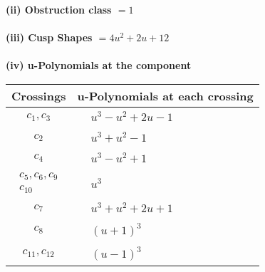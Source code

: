 \documentclass[1p]{elsarticle_modified}
\theoremstyle{definition}
\begin{document}
\flushleft \textbf{(ii) Obstruction class $= 1$}\\~\\
\flushleft \textbf{(iii) Cusp Shapes $= 4 u^2+2 u+12$}\\~\\
\newpage\renewcommand{\arraystretch}{1}
\flushleft \textbf{(iv) u-Polynomials at the component}\newline \\
\begin{tabular}{m{50pt}|m{274pt}}
Crossings & \hspace{64pt}u-Polynomials at each crossing \\
\hline $$\begin{aligned}c_{1},c_{3}\end{aligned}$$&$\begin{aligned}
&u^3- u^2+2 u-1
\end{aligned}$\\
\hline $$\begin{aligned}c_{2}\end{aligned}$$&$\begin{aligned}
&u^3+u^2-1
\end{aligned}$\\
\hline $$\begin{aligned}c_{4}\end{aligned}$$&$\begin{aligned}
&u^3- u^2+1
\end{aligned}$\\
\hline $$\begin{aligned}c_{5},c_{6},c_{9}\\c_{10}\end{aligned}$$&$\begin{aligned}
&u^3
\end{aligned}$\\
\hline $$\begin{aligned}c_{7}\end{aligned}$$&$\begin{aligned}
&u^3+u^2+2 u+1
\end{aligned}$\\
\hline $$\begin{aligned}c_{8}\end{aligned}$$&$\begin{aligned}
&(u+1)^3
\end{aligned}$\\
\hline $$\begin{aligned}c_{11},c_{12}\end{aligned}$$&$\begin{aligned}
&(u-1)^3
\end{aligned}$\\
\hline
\end{tabular}\\~\\
\end{document}
